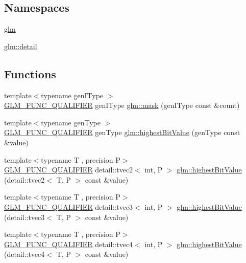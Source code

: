 \subsection*{Namespaces}
\begin{DoxyCompactItemize}
\item 
 \hyperlink{namespaceglm}{glm}
\item 
 \hyperlink{namespaceglm_1_1detail}{glm\+::detail}
\end{DoxyCompactItemize}
\subsection*{Functions}
\begin{DoxyCompactItemize}
\item 
{\footnotesize template$<$typename gen\+I\+Type $>$ }\\\hyperlink{setup_8hpp_a33fdea6f91c5f834105f7415e2a64407}{G\+L\+M\+\_\+\+F\+U\+N\+C\+\_\+\+Q\+U\+A\+L\+I\+F\+I\+ER} gen\+I\+Type \hyperlink{group__gtx__bit_ga79f1482a09c91f785e7e0ea8aed2b20e}{glm\+::mask} (gen\+I\+Type const \&count)
\item 
{\footnotesize template$<$typename gen\+Type $>$ }\\\hyperlink{setup_8hpp_a33fdea6f91c5f834105f7415e2a64407}{G\+L\+M\+\_\+\+F\+U\+N\+C\+\_\+\+Q\+U\+A\+L\+I\+F\+I\+ER} gen\+Type \hyperlink{group__gtx__bit_ga9621840252c293918780bc3890374b86}{glm\+::highest\+Bit\+Value} (gen\+Type const \&value)
\item 
{\footnotesize template$<$typename T , precision P$>$ }\\\hyperlink{setup_8hpp_a33fdea6f91c5f834105f7415e2a64407}{G\+L\+M\+\_\+\+F\+U\+N\+C\+\_\+\+Q\+U\+A\+L\+I\+F\+I\+ER} detail\+::tvec2$<$ int, P $>$ \hyperlink{namespaceglm_a4f75fd8e2634dcbac5c81ecb1f40a5be}{glm\+::highest\+Bit\+Value} (detail\+::tvec2$<$ T, P $>$ const \&value)
\item 
{\footnotesize template$<$typename T , precision P$>$ }\\\hyperlink{setup_8hpp_a33fdea6f91c5f834105f7415e2a64407}{G\+L\+M\+\_\+\+F\+U\+N\+C\+\_\+\+Q\+U\+A\+L\+I\+F\+I\+ER} detail\+::tvec3$<$ int, P $>$ \hyperlink{namespaceglm_a3cc0f5abbbb75eaed77259e59e64c601}{glm\+::highest\+Bit\+Value} (detail\+::tvec3$<$ T, P $>$ const \&value)
\item 
{\footnotesize template$<$typename T , precision P$>$ }\\\hyperlink{setup_8hpp_a33fdea6f91c5f834105f7415e2a64407}{G\+L\+M\+\_\+\+F\+U\+N\+C\+\_\+\+Q\+U\+A\+L\+I\+F\+I\+ER} detail\+::tvec4$<$ int, P $>$ \hyperlink{namespaceglm_a89cb0ee8fe4da392e1b3662512bee20d}{glm\+::highest\+Bit\+Value} (detail\+::tvec4$<$ T, P $>$ const \&value)

\end{DoxyCompactItemize}
